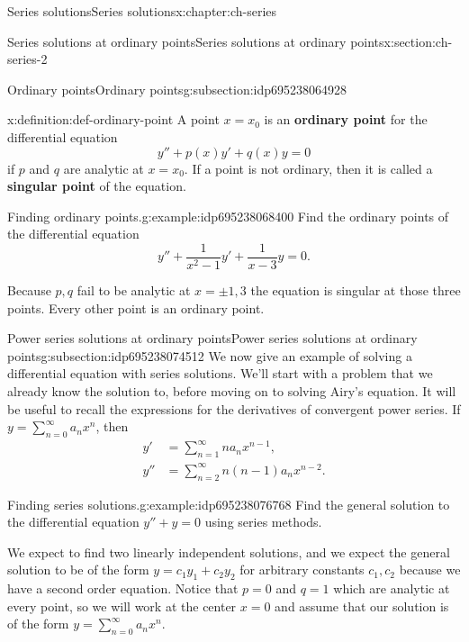 \documentclass[oneside,10pt,]{book}
\newcommand{\terminology}[1]{\textbf{#1}}
\numberwithin{equation}{section}
\numberwithin{equation}{section}
\newcommand{\ps}{\displaystyle \sum_{n=0}^\infty a_n x^n}
\newcommand{\amp}{&}
\begin{document}
\begin{chapterptx}{Series solutions}{}{Series solutions}{}{}{x:chapter:ch-series}
\begin{sectionptx}{Series solutions at ordinary points}{}{Series solutions at ordinary points}{}{}{x:section:ch-series-2}
\begin{subsectionptx}{Ordinary points}{}{Ordinary points}{}{}{g:subsection:idp695238064928}
\begin{definition}{}{x:definition:def-ordinary-point}%
A point \(x = x_0\) is an \terminology{ordinary point} for the differential equation%
\begin{equation*}
y'' + p(x) y' + q(x) y = 0
\end{equation*}
if \(p\) and \(q\) are analytic at \(x = x_0\). If a point is not ordinary, then it is called a \terminology{singular point} of the equation.%
\end{definition}
\begin{example}{Finding ordinary points.}{g:example:idp695238068400}%
Find the ordinary points of the differential equation%
\begin{equation*}
y'' + \frac{1}{x^2 - 1} y' + \frac{1}{x - 3} y = 0.
\end{equation*}
%
\par
Because \(p, q\) fail to be analytic at \(x = \pm 1, 3\) the equation is singular at those three points. Every other point is an ordinary point.%
\end{example}
\end{subsectionptx}
%
%
\typeout{************************************************}
\typeout{************************************************}
%
\begin{subsectionptx}{Power series solutions at ordinary points}{}{Power series solutions at ordinary points}{}{}{g:subsection:idp695238074512}
We now give an example of solving a differential equation with series solutions. We'll start with a problem that we already know the solution to, before moving on to solving Airy's equation. It will be useful to recall the expressions for the derivatives of convergent power series. If \(y = \ps\), then%
\begin{align*}
y' \amp= \sum_{n=1}^\infty n a_n x^{n-1},\\
y'' \amp = \sum_{n=2}^\infty n(n-1) a_n x^{n-2}.
\end{align*}
%
\begin{example}{Finding series solutions.}{g:example:idp695238076768}%
Find the general solution to the differential equation \(y'' + y = 0\) using series methods.%
\par
We expect to find two linearly independent solutions, and we expect the general solution to be of the form \(y = c_1 y_1 + c_2 y_2\) for arbitrary constants \(c_1, c_2\) because we have a second order equation. Notice that \(p = 0\) and \(q = 1\) which are analytic at every point, so we will work at the center \(x = 0\) and assume that our solution is of the form \(y = \ps\).%

\end{example}
\end{subsectionptx}
\end{sectionptx}
\end{chapterptx}
\end{document}
